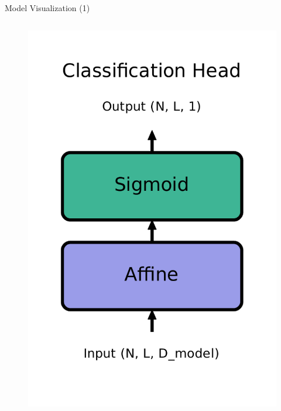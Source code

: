 \documentclass[10pt]{beamer}
\begin{document}
\begin{frame}[fragile]{Model Visualization (1)}
\begin{columns}
\begin{column}{0.3\textwidth}
\begin{figure}
    \centering
    \includegraphics[height=0.4\textheight]{figures/model/simple-output-proj.pdf}
\end{figure}    
\end{column}

\end{columns}

\end{frame}
\end{document}

